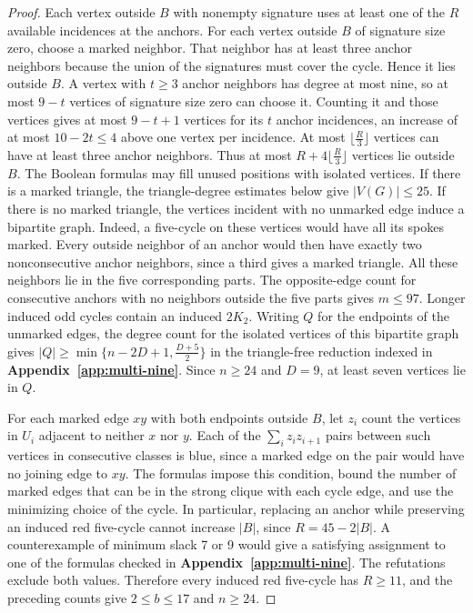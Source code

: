 \documentclass[preprint,11pt,numbers]{elsarticle-arxiv}
\numberwithin{equation}{section}
\theoremstyle{definition}
\begin{document}
\begin{proof}
Each vertex outside $B$ with nonempty signature uses at least
one of the $R$ available incidences at the anchors. For each
vertex outside $B$ of signature size zero, choose a marked
neighbor. That neighbor has at least three anchor neighbors
because the union of the signatures must cover the cycle.
Hence it lies outside $B$. A vertex with $t\ge3$ anchor
neighbors has degree at most nine, so at most $9-t$ vertices
of signature size zero can choose it. Counting it and those
vertices gives at most $9-t+1$ vertices for its $t$ anchor
incidences, an increase of at most $10-2t\le4$ above one
vertex per incidence. At most $\lfloor\frac{R}{3}\rfloor$
vertices can have at least three anchor neighbors. Thus at
most $R+4\lfloor\frac{R}{3}\rfloor$ vertices lie outside $B$.
The Boolean formulas may fill unused positions with isolated
vertices. If there is a marked triangle, the triangle-degree
estimates below give $|V(G)|\le25$. If there is no marked
triangle, the vertices
incident with no unmarked edge induce a bipartite graph. Indeed, a
five-cycle on these vertices would have all its spokes marked. Every
outside neighbor of an anchor would then have exactly two
nonconsecutive anchor neighbors, since a third gives a marked
triangle. All these neighbors lie in the five corresponding parts.
The opposite-edge count for consecutive anchors with no neighbors
outside the five parts gives $m\leq97$. Longer induced odd cycles
contain an induced $2K_2$. Writing $Q$ for the endpoints of the
unmarked edges, the degree count for the isolated vertices of this
bipartite graph gives
$|Q|\geq\min\{n-2D+1,\frac{D+5}{2}\}$ in the triangle-free
reduction indexed in \textbf{Appendix~\ref{app:multi-nine}}.
Since $n\geq24$ and $D=9$, at least seven vertices lie in $Q$.

For each marked edge $xy$ with both endpoints outside $B$,
let $z_i$ count the vertices in $U_i$ adjacent to neither
$x$ nor $y$. Each of the $\sum_i z_i z_{i+1}$ pairs between
such vertices in consecutive classes is blue, since a marked
edge on the pair would have no joining edge to $xy$. The
formulas impose this condition, bound the number of marked
edges that can be in the strong clique with each cycle edge,
and use the minimizing choice of the cycle. In particular,
replacing an anchor while preserving an induced red five-cycle
cannot increase $|B|$, since $R=45-2|B|$. A counterexample of
minimum slack 7 or 9 would give a satisfying assignment to
one of the formulas checked in
\textbf{Appendix~\ref{app:multi-nine}}. The refutations
exclude both values. Therefore every induced red five-cycle
has $R\ge11$, and the preceding counts give $2\le b\le17$
and $n\ge24$.

\end{proof}
\end{document}
